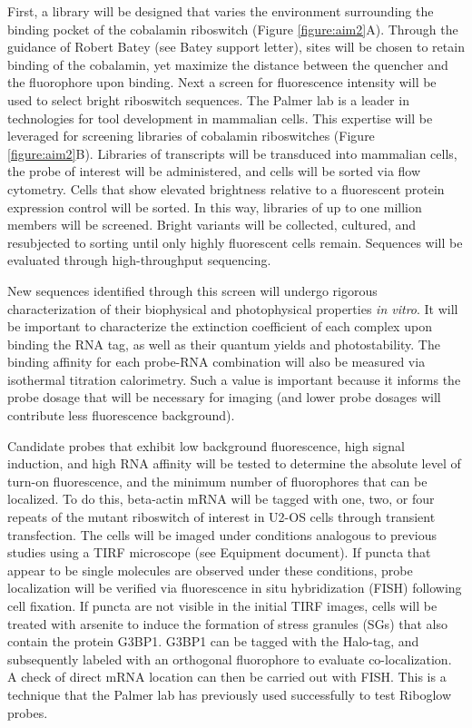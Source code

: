 First, a library will be designed that varies the environment surrounding the binding pocket of the cobalamin riboswitch (Figure \ref{figure:aim2}A). Through the guidance of Robert Batey (see Batey support letter), sites will be chosen to retain binding of the cobalamin, yet maximize the distance between the quencher and the fluorophore upon binding\cite{JohnsonJrB12cofactorsdirectly2012}.
Next a screen for fluorescence intensity will be used to select bright riboswitch sequences.
The Palmer lab is a leader in technologies for tool development in mammalian cells\cite{FiedlerDropletMicrofluidicFlow2017,DeanHighSpeedMultiparameterPhotophysical2015}.
This expertise will be leveraged for screening libraries of cobalamin riboswitches (Figure \ref{figure:aim2}B). Libraries of transcripts will be transduced into mammalian cells, the probe of interest will be administered, and cells will be sorted via flow cytometry. Cells that show elevated brightness relative to a fluorescent protein expression control will be sorted.
In this way, libraries of up to one million members will be screened. Bright variants will be collected, cultured, and resubjected to sorting until only highly fluorescent cells remain. Sequences will be evaluated through high-throughput sequencing.

New sequences identified through this screen will undergo rigorous characterization of their biophysical and photophysical properties \textit{in vitro}. It will be important to characterize the extinction coefficient of each complex upon binding the RNA tag, as well as their quantum yields and photostability. The binding affinity for each probe-RNA combination will also be measured via isothermal titration calorimetry. Such a value is important because it informs the probe dosage that will be necessary for imaging (and lower probe dosages will contribute less fluorescence background).

Candidate probes that exhibit low background fluorescence, high signal induction, and high RNA affinity will be tested to determine the absolute level of turn-on fluorescence, and the minimum number of fluorophores that can be localized. To do this, beta-actin mRNA will be tagged with one, two, or four repeats of the mutant riboswitch of interest in U2-OS cells through transient transfection. The cells will be imaged under conditions analogous to previous studies\cite{KatzMappingtranslationhotspots2016} using a TIRF microscope (see Equipment document). If puncta that appear to be single molecules are observed under these conditions, probe localization will be verified via fluorescence in situ hybridization (FISH) following cell fixation. If puncta are not visible in the initial TIRF images, cells will be treated with arsenite to induce the formation of stress granules (SGs) that also contain the protein G3BP1\cite{ZurlaCharacterizingmRNAInteractions2011,JainATPaseModulatedStressGranules2016,NellesProgrammableRNATracking2016}.
G3BP1 can be tagged with the Halo-tag, and subsequently labeled with an orthogonal fluorophore to evaluate co-localization. A check of direct mRNA location can then be carried out with FISH.
This is a technique that the Palmer lab has previously used successfully to test Riboglow probes\cite{BraselmannDevelopmentriboswitchbasedplatform2017}.

